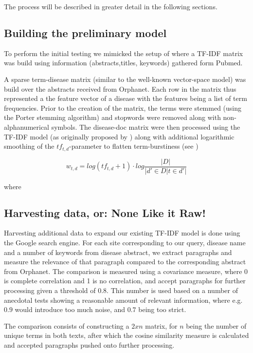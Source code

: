 \documentclass[10pt,letterpaper,draft]{article}
\begin{document}
The process will be described in greater detail in the following
sections.

\subsection{Building the preliminary model}
To perform the initial testing we mimicked the setup of \cite{jensenandersen} where a TF-IDF matrix was build using information (abstracts,titles, keywords) gathered form Pubmed. 

A sparse term-disease matrix (similar to the well-known vector-space model) was build over the abstracts received from Orphanet. Each row in the matrix thus represented a the feature vector of a disease with the features being a list of term frequencies. Prior to the creation of the matrix, the terms were stemmed (using the Porter stemming algorithm) and stopwords were removed along with non-alphanumerical symbols. The disease-doc matrix were then processed using the TF-IDF model (as originally proposed by \cite{tfidf}) along with additional logarithmic smoothing of the $tf_{t,d}$-parameter to flatten term-burstiness (see \cite{burstiness})

\[
w_{t,d} = log(tf_{t,d}+1)\cdot log\frac{|D|}{|{d'\in D|t\in d'}|}
\]

where 



\subsection{Harvesting data, or: None Like it Raw!}
Harvesting additional data to expand our existing TF-IDF model is done
using the Google search engine. For each site corresponding to our
query, disease name and a number of keywords from disease abstract, we
extract paragraphs and measure the relevance of that paragraph compared
to the corresponding abstract from Orphanet. The comparison is measured
using a covariance measure, where 0 is complete correlation and 1 is no
correlation, and accept paragraphs for further processing given a
threshold of $0.8$. This number is used based on a number of anecdotal
tests showing a reasonable amount of relevant information, where e.g.
$0.9$ would introduce too much noise, and $0.7$ being too strict.

The comparison consists of constructing a $2 x n$ matrix, for $n$ being
the number of unique terms in both texts, after which the cosine
similarity measure is calculated and accepted paragraphs pushed onto
further processing.
\end{document}
